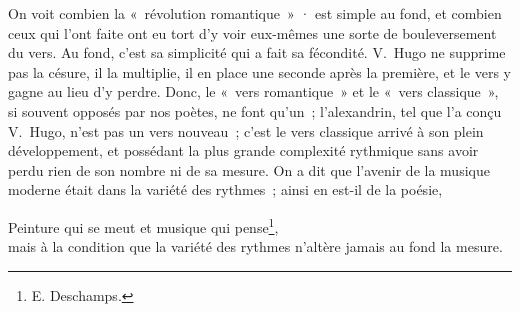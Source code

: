 \documentclass[french,twoside]{book} %
\begin{document}
 On voit combien la « révolution romantique » · est simple au fond, et combien ceux qui l’ont faite ont eu tort d’y voir  eux-mêmes une sorte de bouleversement du vers. Au fond, c’est sa simplicité qui a fait sa fécondité. V. Hugo ne supprime pas la césure, il la multiplie, il en place une seconde après la première, et le vers y gagne au lieu d’y perdre. Donc, le « vers romantique » et le « vers classique », si souvent opposés par nos poètes, ne font qu’un ; l’alexandrin, tel que l’a conçu V. Hugo, n’est pas un vers nouveau ; c’est le vers classique arrivé à son plein développement, et possédant la plus grande complexité rythmique sans avoir perdu rien de son nombre ni de sa mesure. On a dit que l’avenir de la musique moderne était dans la variété des rythmes ; ainsi en est-il de la poésie,\par

Peinture qui se meut et musique qui pense\footnote{E. Deschamps.},\\

\noindent mais à la condition que la variété des rythmes n’altère jamais au fond la mesure.
\end{document}
